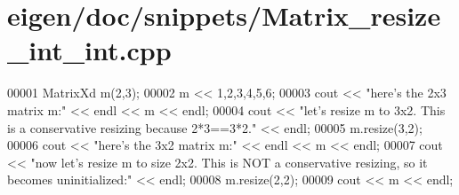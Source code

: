 \hypertarget{eigen_2doc_2snippets_2_matrix__resize__int__int_8cpp_source}{}\section{eigen/doc/snippets/\+Matrix\+\_\+resize\+\_\+int\+\_\+int.cpp}
\label{eigen_2doc_2snippets_2_matrix__resize__int__int_8cpp_source}

\begin{DoxyCode}
00001 MatrixXd m(2,3);
00002 m << 1,2,3,4,5,6;
00003 cout << \textcolor{stringliteral}{"here's the 2x3 matrix m:"} << endl << m << endl;
00004 cout << \textcolor{stringliteral}{"let's resize m to 3x2. This is a conservative resizing because 2*3==3*2."} << endl;
00005 m.resize(3,2);
00006 cout << \textcolor{stringliteral}{"here's the 3x2 matrix m:"} << endl << m << endl;
00007 cout << \textcolor{stringliteral}{"now let's resize m to size 2x2. This is NOT a conservative resizing, so it becomes uninitialized:"}
       << endl;
00008 m.resize(2,2);
00009 cout << m << endl;
\end{DoxyCode}

